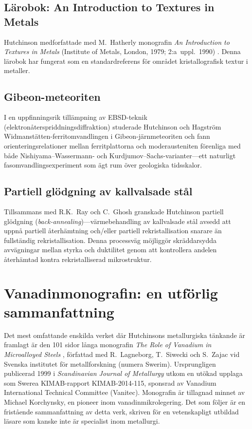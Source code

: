 \documentclass[11pt,a4paper]{article}
\begin{document}
\subsection{L\"arobok: An Introduction to Textures in Metals}

Hutchinson medforfattade med M.~Hatherly monografin \emph{An
Introduction to Textures in Metals} (Institute of Metals, London, 1979;
2:a~uppl.\ 1990) \cite{Hatherly1979}.  Denna l\"arobok har fungerat som
en standardreferens f\"or omr\aa{}det kristallografisk textur i metaller.

\subsection{Gibeon-meteoriten}

I en uppfinningsrik till\"ampning av EBSD-teknik
(elektron\aa{}terspriddningsdiffraktion) studerade Hutchinson och
Hagstr\"om \cite{Hutchinson2006Met} Widmanst\"atten-ferritomvandlingen i
Gibeon-j\"arnmeteoriten och fann orienteringsrelationer mellan
ferritplattorna och moderausteniten f\"orenliga med b\aa{}de
Nishiyama--Wassermann- och Kurdjumov--Sachs-varianter---ett naturligt
fasomvandlingsexperiment som \"agt rum \"over geologiska tidsskalor.

\subsection{Partiell gl\"odgning av kallvalsade st\aa{}l}

Tillsammans med R.K.~Ray och C.~Ghosh \cite{Ray2011} granskade
Hutchinson partiell gl\"odgning (\emph{back-annealing})---v\"armebehandling
av kallvalsade st\aa{}l avsedd att uppn\aa{} partiell \aa{}terh\"amtning
och/eller partiell rekristallisation snarare \"an fullst\"andig
rekristallisation.  Denna processv\"ag m\"ojligg\"or skr\"addarsydda
avv\"agningar mellan styrka och duktilitet genom att kontrollera
andelen \aa{}terh\"amtad kontra rekristalliserad mikrostruktur.

\section{Vanadinmonografin: en utf\"orlig sammanfattning}
\label{sec:vanadium-monograph}

Det mest omfattande enskilda verket d\"ar Hutchinsons metallurgiska
t\"ankande \"ar framlagt \"ar den 101 sidor l\aa{}nga monografin
\emph{The Role of Vanadium in Microalloyed Steels} \cite{Lagneborg2014},
f\"orfattad med R.~Lagneborg, T.~Siwecki och S.~Zajac vid Svenska
institutet f\"or metallforskning (numera Swerim).  Ursprungligen
publicerad 1999 i \emph{Scandinavian Journal of Metallurgy} utkom en
ut\"okad upplaga som Swerea KIMAB-rapport KIMAB-2014-115, sponsrad av
Vanadium International Technical Committee (Vanitec).  Monografin \"ar
tillagnad minnet av Michael Korchynsky, en pioneer inom
vanadinmikrolegering.  Det som f\"oljer \"ar en frist\aa{}ende
sammanfattning av detta verk, skriven f\"or en vetenskapligt utbildad
l\"asare som kanske inte \"ar specialist inom metallurgi.
\end{document}
